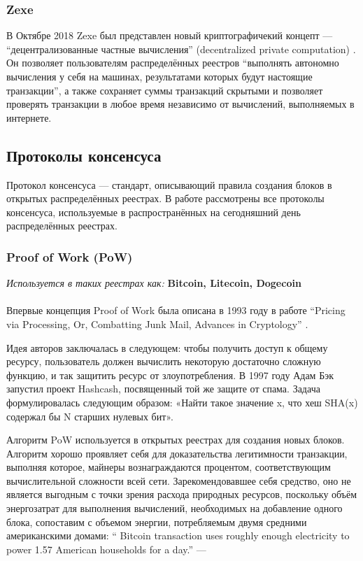 \subsubsection{Zexe}
В Октябре 2018 Zexe был представлен новый криптографичекий концепт ---
``децентрализованные частные вычисления'' (decentralized private computation)
\cite{Bowe2019}. Он позволяет пользователям распределённых реестров ``выполнять
автономно вычисления у себя на машинах, результатами которых будут настоящие
транзакции'', а также сохраняет суммы транзакций скрытыми и позволяет проверять
транзакции в любое время независимо от вычислений, выполняемых в интернете.

\subsection{Протоколы консенсуса}\label{consensus_protocols}
Протокол консенсуса --- стандарт, описывающий правила создания блоков в
открытых распределённых реестрах. В работе рассмотрены все протоколы
консенсуса, используемые в распространённых на сегодняшний день распределённых
реестрах.
\subsubsection{Proof of Work (PoW)}\label{pow}
\emph{Используется в таких реестрах как: } \textbf{Bitcoin, Litecoin, Dogecoin} \\\\
Впервые концепция Proof of Work была описана в 1993 году в работе ``Pricing via
Processing, Or, Combatting Junk Mail, Advances in Cryptology''
\cite{Dwork2007}.

Идея авторов заключалась в следующем: чтобы получить доступ к общему ресурсу,
пользователь должен вычислить некоторую достаточно сложную функцию, и так
защитить ресурс от злоупотребления.  В 1997 году Адам Бэк запустил проект
Hashcash, посвященный той же защите от спама. Задача формулировалась следующим
образом: «Найти такое значение x, что хеш SHA(x) содержал бы N старших нулевых
бит».

Алгоритм PoW используется в открытых реестрах
для создания новых блоков. Алгоритм хорошо проявляет себя для доказательства
легитимности транзакции, выполняя которое, майнеры вознаграждаются процентом,
соответствующим вычислительной сложности всей сети. Зарекомендовавшее себя
средство, оно не является выгодным с точки зрения расхода природных ресурсов,
поскольку объём энергозатрат для выполнения вычислений, необходимых на
добавление одного блока, сопоставим с объемом энергии, потребляемым двумя
средними американскими домами: `` Bitcoin transaction uses roughly enough
electricity to power 1.57 American households for a day.'' --- \cite{amhouses}

